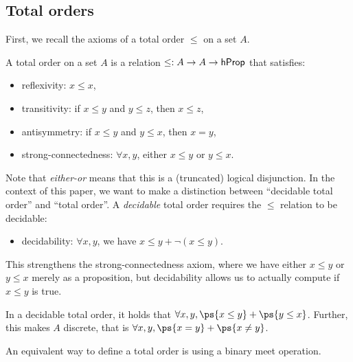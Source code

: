 
\subsection{Total orders}
\label{sec:total-orders}

First, we recall the axioms of a total order $\leq$ on a set $A$.
\begin{definition}
    \label{def:total-order}
    A total order on a set $A$ is a relation $\leq : A \to A \to \mathsf{hProp}$ that satisfies:
    \begin{itemize}
        \item reflexivity: $x \leq x$,
        \item transitivity: if $x \leq y$ and $y \leq z$, then $x \leq z$,
        \item antisymmetry: if $x \leq y$ and $y \leq x$, then $x = y$,
        \item strong-connectedness: $\forall x, y$, either $x \leq y$ or $y \leq x$.
    \end{itemize}
    Note that \emph{either-or} means that this is a (truncated) logical disjunction.
    In the context of this paper, we want to make a distinction between ``decidable total order''
    and ``total order''. A \emph{decidable} total order requires the $\leq$ relation to be decidable:
    \begin{itemize}
        \item decidability: $\forall x, y$, we have $x \leq y + \neg(x \leq y)$.
    \end{itemize}
\end{definition}
This strengthens the strong-connectedness axiom,
where we have either $x \leq y$ or $y \leq x$ merely as a proposition,
but decidability allows us to actually compute if $x \leq y$ is true.
\begin{proposition}
    \label{prop:decidable-total-order}
    In a decidable total order, it holds that ${\forall x, y}, \ps{x \leq y} + \ps{y \leq x}$.
    Further, this makes $A$ discrete, that is ${\forall x, y}, \ps{x \id y} + \ps{x \neq y}$.
\end{proposition}
%
An equivalent way to define a total order is using a binary meet operation.
